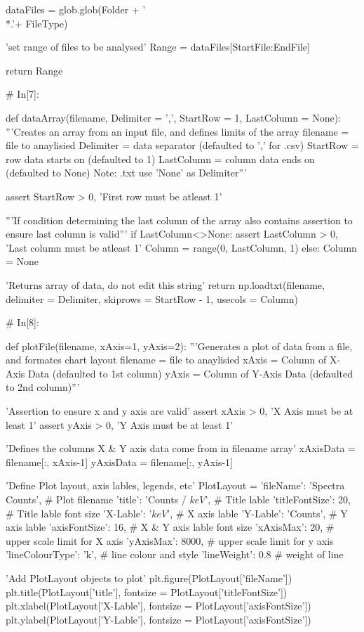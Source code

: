 \documentclass[a4paper,8pt]{article}
\begin{document}
\begin{python}
dataFiles = glob.glob(Folder + '\\*.'+ FileType)

'set range of files to be analysed'
Range = dataFiles[StartFile:EndFile]

return Range


# In[7]:

def dataArray(filename, Delimiter = ',', StartRow = 1, LastColumn = None):
'''Creates an array from an input file, and defines limits of the array
filename = file to anaylisied
Delimiter = data separator (defaulted to ',' for .csv)
StartRow = row data starts on (defaulted to 1)
LastColumn = column data ends on (defaulted to None)
Note: .txt use 'None' as Delimiter'''

assert StartRow > 0, 'First row must be atleast 1'

'''If condition determining the last column of the array
also contains assertion to ensure last column is valid'''
if LastColumn<>None:
assert LastColumn > 0, 'Last column must be atleast 1'
Column = range(0, LastColumn, 1)
else:
Column = None

'Returns array of data, do not edit this string'
return np.loadtxt(filename, delimiter = Delimiter,
skiprows = StartRow - 1, 
usecols = Column)


# In[8]:

def plotFile(filename, xAxis=1, yAxis=2):
'''Generates a plot of data from a file, and formates chart layout
filename = file to anaylisied
xAxis = Column of X-Axis Data (defaulted to 1st column)
yAxis = Column of Y-Axis Data (defaulted to 2nd column)'''

'Assertion to ensure x and y axis are valid'
assert xAxis > 0, 'X Axis must be at least 1'
assert yAxis > 0, 'Y Axis must be at least 1'

'Defines the columns X & Y axis data come from in filename array'
xAxisData = filename[:, xAxis-1]
yAxisData = filename[:, yAxis-1]

'Define Plot layout, axis lables, legends, etc'
PlotLayout = {'fileName': 'Spectra Counts', # Plot filename 
	'title': 'Counts / $keV$', # Title lable
	'titleFontSize': 20, # Title lable font size
	'X-Lable': '$keV$', # X axis lable
	'Y-Lable': 'Counts', # Y axis lable
	'axisFontSize': 16, # X & Y axis lable font size
	'xAxisMax': 20, # upper scale limit for X axis
	'yAxisMax': 8000, # upper scale limit for y axis
	'lineColourType': 'k', # line colour and style
	'lineWeight': 0.8 # weight of line
}

'Add PlotLayout objects to plot'
plt.figure(PlotLayout['fileName'])
plt.title(PlotLayout['title'], fontsize = PlotLayout['titleFontSize'])
plt.xlabel(PlotLayout['X-Lable'], fontsize = PlotLayout['axisFontSize'])
plt.ylabel(PlotLayout['Y-Lable'], fontsize = PlotLayout['axisFontSize'])


\end{python}
\end{document}
